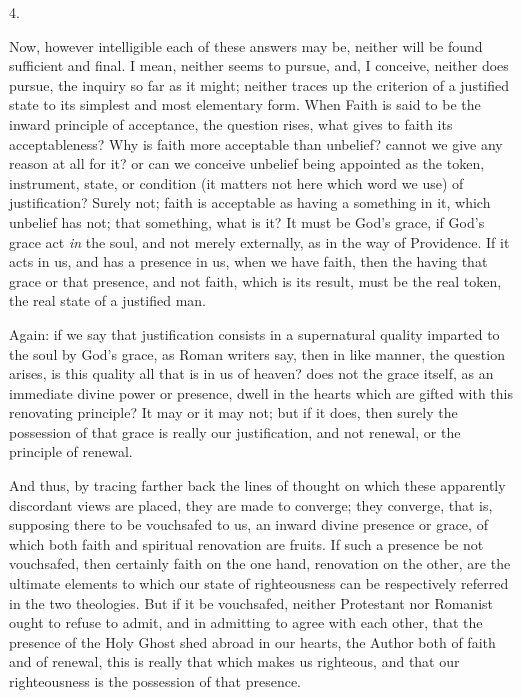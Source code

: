 4.

Now, however intelligible each of these answers may be, neither
will be found sufficient and final. I mean, neither seems to pursue,
and, I conceive, neither does pursue, the inquiry so far as it might;
neither traces up the criterion of a justified state to its simplest
and most elementary form. When Faith is said to be the inward
principle of acceptance, the question rises, what gives to faith its
acceptableness? Why is faith more acceptable than unbelief? cannot we
give any reason at all for it? or can we conceive unbelief being
appointed as the token, instrument, state, or condition (it matters
not here which word we use) of justification? Surely not; faith is
acceptable as having a something in it, which unbelief has not; that
something, what is it? It must be God's grace, if God's grace act \emph{in}
the soul, and not merely externally, as in the way of Providence. If
it acts in us, and has a presence in us, when we have faith, then the
having that grace or that presence, and not faith, which is its
result, must be the real token, the real state of a justified man.

Again: if we say that justification consists in a supernatural
quality imparted to the soul by God's grace, as Roman writers say,
then in like manner, the question arises, is this quality all
that is in us of heaven? does not the grace itself, as an immediate
divine power or presence, dwell in the hearts which are gifted with
this renovating principle? It may or it may not; but if it does, then
surely the possession of that grace is really our justification, and
not renewal, or the principle of renewal.

And thus, by tracing farther back the lines of thought on which
these apparently discordant views are placed, they are made to
converge; they converge, that is, supposing there to be vouchsafed to
us, an inward divine presence or grace, of which both faith and
spiritual renovation are fruits. If such a presence be not vouchsafed,
then certainly faith on the one hand, renovation on the other, are the
ultimate elements to which our state of righteousness can be
respectively referred in the two theologies. But if it be vouchsafed,
neither Protestant nor Romanist ought to refuse to admit, and in
admitting to agree with each other, that the presence of the Holy
Ghost shed abroad in our hearts, the Author both of faith and of
renewal, this is really that which makes us righteous, and that our
righteousness is the possession of that presence.

